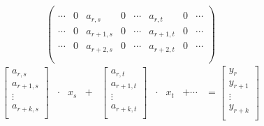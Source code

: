 \documentclass{article}
\begin{document}
      \begin{figure}[ht]
        \centering
        $$
        \begin{pmatrix}
          \\
          \cdots & 0 & a_{r,s} &  0 & \cdots & a_{r,t} & 0 & \cdots \\
          \cdots & 0 & a_{r+1,s} & 0 & \cdots & a_{r+1,t} & 0 & \cdots \\
          \cdots & 0 & a_{r+2,s} & 0 & \cdots & a_{r+2,t} & 0 & \cdots \\
          \\
        \end{pmatrix}
        $$
        $$
        \begin{matrix}
          \begin{bmatrix}
            a_{r,s}     \\
            a_{r+1,s} \\
               \vdots   \\
            a_{r+k,s} \\
          \end{bmatrix} & \cdot & x_s & + & \begin{bmatrix}
                                              a_{r,t}     \\
                                              a_{r+1,t} \\
                                                \vdots    \\
                                              a_{r+k,t} \\
                                            \end{bmatrix} & \cdot & x_t & + \cdots & = \begin{bmatrix}
                                                                                       y_{r}   \\
                                                                                       y_{r+1} \\
                                                                                       \vdots  \\
                                                                                       y_{r+k} \\

\end{bmatrix}
\end{matrix}$$
\end{figure}
\end{document}

